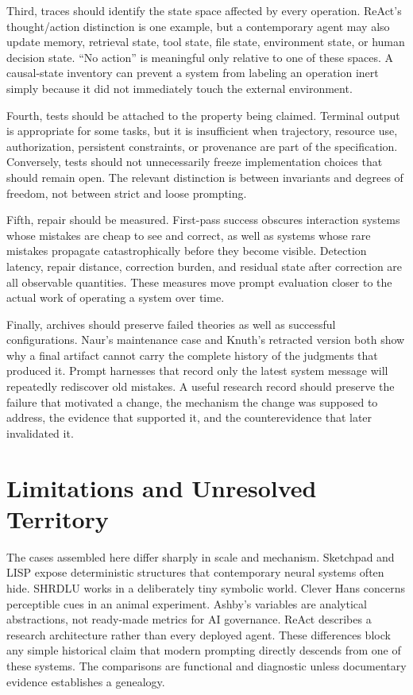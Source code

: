 \documentclass[11pt]{article}
\begin{document}
Third, traces should identify the state space affected by every operation. ReAct's thought/action distinction is one example, but a contemporary agent may also update memory, retrieval state, tool state, file state, environment state, or human decision state. ``No action'' is meaningful only relative to one of these spaces. A causal-state inventory can prevent a system from labeling an operation inert simply because it did not immediately touch the external environment.

Fourth, tests should be attached to the property being claimed. Terminal output is appropriate for some tasks, but it is insufficient when trajectory, resource use, authorization, persistent constraints, or provenance are part of the specification. Conversely, tests should not unnecessarily freeze implementation choices that should remain open. The relevant distinction is between invariants and degrees of freedom, not between strict and loose prompting.

Fifth, repair should be measured. First-pass success obscures interaction systems whose mistakes are cheap to see and correct, as well as systems whose rare mistakes propagate catastrophically before they become visible. Detection latency, repair distance, correction burden, and residual state after correction are all observable quantities. These measures move prompt evaluation closer to the actual work of operating a system over time.

Finally, archives should preserve failed theories as well as successful configurations. Naur's maintenance case and Knuth's retracted version both show why a final artifact cannot carry the complete history of the judgments that produced it. Prompt harnesses that record only the latest system message will repeatedly rediscover old mistakes. A useful research record should preserve the failure that motivated a change, the mechanism the change was supposed to address, the evidence that supported it, and the counterevidence that later invalidated it.

\section{Limitations and Unresolved Territory}

The cases assembled here differ sharply in scale and mechanism. Sketchpad and LISP expose deterministic structures that contemporary neural systems often hide. SHRDLU works in a deliberately tiny symbolic world. Clever Hans concerns perceptible cues in an animal experiment. Ashby's variables are analytical abstractions, not ready-made metrics for AI governance. ReAct describes a research architecture rather than every deployed agent. These differences block any simple historical claim that modern prompting directly descends from one of these systems. The comparisons are functional and diagnostic unless documentary evidence establishes a genealogy.
\end{document}
